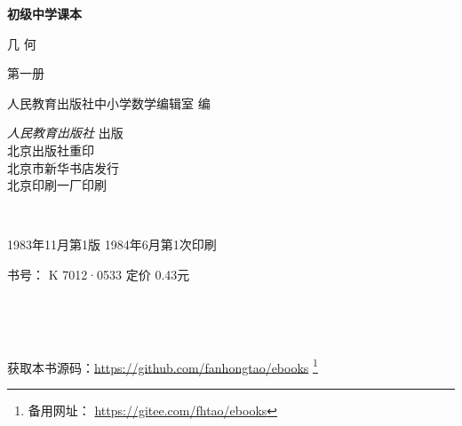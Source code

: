 \begin{titlepage}
    \begin{center}
        \vspace*{3cm}

        {\Large \textbf{初级中学课本} }

        \vspace{1cm}

        {\Huge 几 \qquad 何}

        \vspace{1.5cm}

        {\Large 第一册}

        \vspace{1cm}

        {\Large 人民教育出版社中小学数学编辑室 \quad 编}

        \vfill



        \begin{CJKfilltwosides*}{0pt}
            \textit{人民教育出版社} 出版\\
            北京出版社重印 \\
            北京市新华书店发行 \\
            北京印刷一厂印刷
        \end{CJKfilltwosides*}

        \,

        1983年11月第1版  \qquad 1984年6月第1次印刷

        书号： K 7012·0533 \quad 定价 0.43元

        \,

        \,

        获取本书源码：\url{https://github.com/fanhongtao/ebooks} \footnote{备用网址： \url{https://gitee.com/fhtao/ebooks} }
    \end{center}

    \newpage


\end{titlepage}
